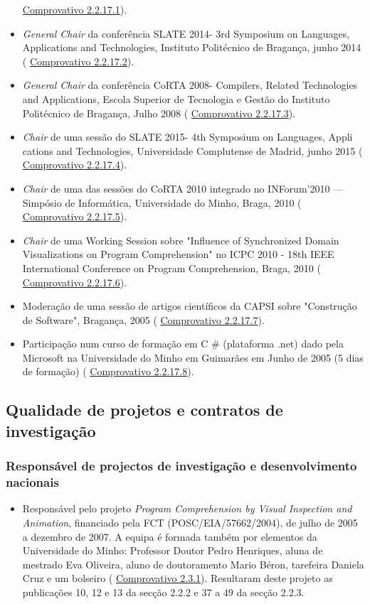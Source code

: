 \documentclass[11pt]{article}
\begin{document}
\begin{itemize}
{\href{run:OutrasActCientif/provas.pdf}{Comprovativo 2.2.17.1}).}
\item{{
\em{ General Chair}} da conferência SLATE 2014- 3rd Symposium on Languages, Applications and Technologies, Instituto Politécnico de Bragança, junho 2014 (
\href{run:OutrasActCientif/GCslate2014.pdf}{Comprovativo 2.2.17.2}).}
\item{{
\em{ General Chair}} da conferência CoRTA 2008- Compilers, Related Technologies and Applications, Escola Superior de Tecnologia e Gestão do Instituto Politécnico de Bragança, Julho 2008 (
\href{run:OutrasActCientif/EDcorta08.pdf}{Comprovativo 2.2.17.3}).}
\item{{
\em{ Chair}} de uma sessão do SLATE 2015- 4th Symposium on Languages, Appli cations and Technologies, Universidade Complutense de Madrid, junho 2015 (
\href{run:OutrasActCientif/CHslate2015.pdf}{Comprovativo 2.2.17.4}).}
\item{{
\em{ Chair}} de uma das sessões do CoRTA 2010 integrado no INForum'2010 --- Simpósio de Informática, Universidade do Minho, Braga, 2010 (
\href{run:OutrasActCientif/CHCoRTA2010.pdf}{Comprovativo 2.2.17.5}).}
\item{{
\em{ Chair}} de uma Working Session sobre "Influence of Synchronized Domain Visualizations on Program Comprehension" no ICPC 2010 - 18th IEEE International Conference on Program Comprehension, Braga, 2010 (
\href{run:OutrasActCientif/WSicpc2010.pdf}{Comprovativo 2.2.17.6}).}
\item{Moderação de uma sessão de artigos científicos da CAPSI sobre "Construção de Software", Bragança, 2005 (
\href{run:OutrasActCientif/ModeradorCapsi05.pdf}{Comprovativo 2.2.17.7}).}
\item{Participação num curso de formação em C
\# (plataforma .net) dado pela Microsoft na Universidade do Minho em Guimarães em Junho de 2005 (5 dias de formação) (
\href{run:OutrasActCientif/cursoGuimaraes.pdf}{Comprovativo 2.2.17.8}).}
\end{itemize} 
\subsection{Qualidade de projetos e contratos de investigação}
\subsubsection{Responsável de projectos de investigação e desenvolvimento nacionais}
\begin{itemize}
\item{Responsável pelo projeto {
\em{ Program Comprehension by Visual Inspection and Animation}}, financiado pela FCT (POSC/EIA/57662/2004), de julho de 2005 a dezembro de 2007. A equipa é formada também por elementos da Universidade do Minho: Professor Doutor Pedro Henriques, aluna de mestrado Eva Oliveira, aluno de doutoramento Mario Béron, tarefeira Daniela Cruz e um bolseiro (
\href{run:Projectos/ComprovativoPCVIA.pdf}{Comprovativo 2.3.1}). Resultaram deste projeto as publicações 10, 12 e 13 da secção 2.2.2 e 37 a 49 da secção 2.2.3.}
\end{itemize}
\end{document}
